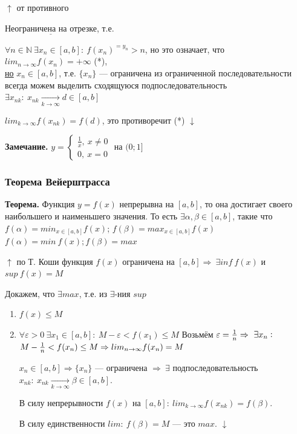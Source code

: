 \documentclass{article}
\begin{document}
    \(\uparrow\) от противного

    \(\underline{\textrm{Неограничена на отрезке}}\), т.е.

    \(\forall n \in \mathbb{N}\ \exists x_n \in [a,b]:\ f(x_n)^{=y_n} > n\), но это означает, что \(lim_{n \rightarrow \infty} f(x_n) = +\infty\) (*),\\
    \underline{\underline{но}} \(x_n \in [a,b]\), т.е. \(\{x_n\}\) --- ограничена из ограниченной последовательности всегда можем выделить сходящуюся подпоследовательность\\
    \(\exists x_{nk}:\ x_{nk} \xrightarrow[k \rightarrow \infty]{} d \in [a,b]\)

    \(lim_{k \rightarrow \infty} f(x_{nk}) = f(d)\), это противоречит (*) \(\downarrow\)

    \textbf{Замечание.}
    \( y = \begin{cases}
        \frac{1}{x},\ x \neq 0\\
        0,\ x = 0
    \end{cases} \) на \( (0; 1] \)
    

    \subsubsection{Теорема Вейерштрасса}
    \textbf{Теорема.} Функция \( y = f(x) \) непрерывна на \( [a, b] \), то она достигает своего наибольшего и наименьшего значения. То есть \( \exists \alpha, \beta \in [a, b] \), такие что \( f(\alpha) = min_{x \in [a, b]} f(x)\); \( f(\beta) = max_{x \in [a, b]} f(x)\)
    \( f(\alpha) = min\ f(x); f(\beta) = max \)

    \(\uparrow\) по Т. Коши функция \(f(x)\) ограничена на \([a,b] \Rightarrow\ \exists inf\ f(x)\) и \(sup\ f(x) = M\)
    
    Докажем, что \(\exists max\), т.е. из \(\exists\)-ния \(sup\) 

    \begin{enumerate}
        \item \(f(x) \leq M\)
        \item \(\forall \varepsilon > 0\ \exists x_1 \in [a,b]:\ M - \varepsilon < f(x_1) \leq M\)
        Возьмём \(\varepsilon = \frac{1}{n} \Rightarrow\ \exists x_n:\\\)
        \(M - \frac{1}{n} < f(x_n) \leq M\\ \Rightarrow lim_{n \rightarrow \infty} f(x_n) = M\)

        \(x_n \in [a,b] \Rightarrow \{x_n\}\) --- ограничена \(\Rightarrow\ \exists\) подпоследовательность \(x_{nk}:\ x_{nk} \xrightarrow[k \rightarrow \infty]{} \beta \in [a, b]\).

        В силу непрерывности \( f(x) \) на \( [a, b]:\ lim_{k \to \infty} f(x_{nk}) = f(\beta) \).

        В силу единственности \( lim:\ f(\beta) = M \) --- это \( max \). \( \downarrow \)
    \end{enumerate}
\end{document}
